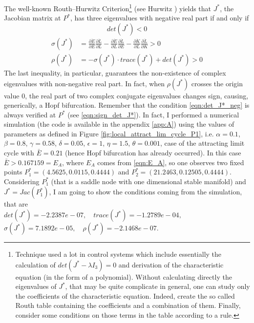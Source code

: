 The well-known Routh–Hurwitz Criterion\footnote{Technique used a lot in control systems which include essentially the calculation of $det(J^*-\lambda I_3)=0$ and derivation of the characteristic equation (in the form of a polynomial). Without calculating directly the eigenvalues of $J^*$, that may be quite complicate in general, one can study only the coefficients of the characteristic equation. Indeed, create the so called Routh table containing the coefficients and a combination of them. Finally, consider some conditions on those terms in the table according to a rule.} (see Hurwitz \cite{hurwitz_conditions_1964}) yields that $J^*$, the Jacobian matrix at $P^*$, has three eigenvalues with negative real part if and only if
\begin{equation} \label{eqn:det_J*_neg}
	det(J^*)<0
\end{equation}
\begin{equation} \label{eqn:cond_sigma_rho_stab}
	\begin{split}
		\sigma(J^*) &= \frac{\partial\dot{E}}{\partial E}\frac{\partial\dot{L}}{\partial L}-\frac{\partial\dot{E}}{\partial L}\frac{\partial\dot{L}}{\partial E}-\frac{\partial\dot{K}}{\partial L}\frac{\partial\dot{L}}{\partial K}>0\\
		\rho(J^*) &= -\sigma(J^*)\cdot trace(J^*)+det(J^*)>0
	\end{split}
\end{equation}
The last inequality, in particular, guarantees the non-existence of complex eigenvalues with non-negative real part. In fact, when $\rho(J^*)$ crosses the origin value $0$, the real part of two complex conjugate eigenvalues changes sign, causing, generically, a Hopf bifurcation.
Remember that the condition \eqref{eqn:det_J*_neg} is always verified at $P^*$ (see \eqref{eqn:sign_det_J*}). In fact, I performed a numerical simulation (the code is available in the appendix \ref{app:A}) using the values of parameters as defined in Figure \ref{fig:local_attract_lim_cycle_P1}, i.e. $\alpha=0.1$, $\beta=0.8$, $\gamma=0.58$, $\delta=0.05$, $\epsilon=1$, $\eta=1.5$, $\theta=0.001$, case of the attracting limit cycle with $\bar{E}=0.21$ (hence Hopf bifurcation has already occurred). In this case $\bar{E}>0.167159=E_A$, where $E_A$ comes from \eqref{eqn:E_A}, so one observes two fixed points $P_1^*=(4.5625,0.0115,0.4444)$ and $P_2^*=(21.2463,0.12505,0.4444)$. Considering $P_1^*$ (that is a saddle node with one dimensional stable manifold) and $J^*=Jac(P_1^*)$, I am going to show the conditions coming from the simulation, that are \\$det(J^*)=-2.2387e-07,\quad trace(J^*)=-1.2789e-04,$\\ $\sigma(J^*)=7.1892e-05,\quad \rho(J^*)=-2.1468e-07$. \\
